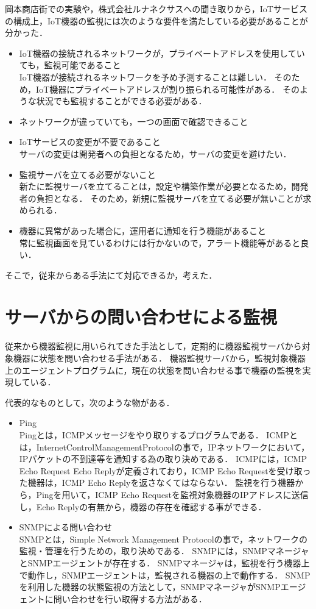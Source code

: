 岡本商店街での実験や，株式会社ルナネクサスへの聞き取りから，IoTサービスの構成上，IoT機器の監視には次のような要件を満たしている必要があることが分かった．
\begin{itemize}
\item IoT機器の接続されるネットワークが，プライベートアドレスを使用していても，監視可能であること\\
	IoT機器が接続されるネットワークを予め予測することは難しい．
	そのため，IoT機器にプライベートアドレスが割り振られる可能性がある．
	そのような状況でも監視することができる必要がある．
\item ネットワークが違っていても，一つの画面で確認できること\\
\item IoTサービスの変更が不要であること\\
	サーバの変更は開発者への負担となるため，サーバの変更を避けたい．
\item 監視サーバを立てる必要がないこと\\
	新たに監視サーバを立てることは，設定や構築作業が必要となるため，開発者の負担となる．
	そのため，新規に監視サーバを立てる必要が無いことが求められる．
\item 機器に異常があった場合に，運用者に通知を行う機能があること\\
	常に監視画面を見ているわけには行かないので，アラート機能等があると良い．
\end{itemize}

そこで，従来からある手法にて対応できるか，考えた．
\section{サーバからの問い合わせによる監視}
	従来から機器監視に用いられてきた手法として，定期的に機器監視サーバから対象機器に状態を問い合わせる手法がある．
	機器監視サーバから，監視対象機器上のエージェントプログラムに，現在の状態を問い合わせる事で機器の監視を実現している．
	\medskip

	代表的なものとして，次のような物がある．
	\begin{itemize}
		\item Ping\\
			Pingとは，ICMPメッセージをやり取りするプログラムである．
			ICMPとは，InternetControlManagementProtocolの事で，IPネットワークにおいて，IPパケットの不到達等を通知する為の取り決めである．
			ICMPには，ICMP Echo Request Echo Replyが定義されており，ICMP Echo Requestを受け取った機器は，ICMP Echo Replyを返さなくてはならない．
			監視を行う機器から，Pingを用いて，ICMP Echo Requestを監視対象機器のIPアドレスに送信し，Echo Replyの有無から，機器の存在を確認する事ができる．
		\item SNMPによる問い合わせ\\
			SNMPとは，Simple Network Management Protocolの事で，ネットワークの監視・管理を行うための，取り決めである．
			SNMPには，SNMPマネージャとSNMPエージェントが存在する．
			SNMPマネージャは，監視を行う機器上で動作し，SNMPエージェントは，監視される機器の上で動作する．
			SNMPを利用した機器の状態監視の方法として，SNMPマネージャがSNMPエージェントに問い合わせを行い取得する方法がある．
	\end{itemize}
	
